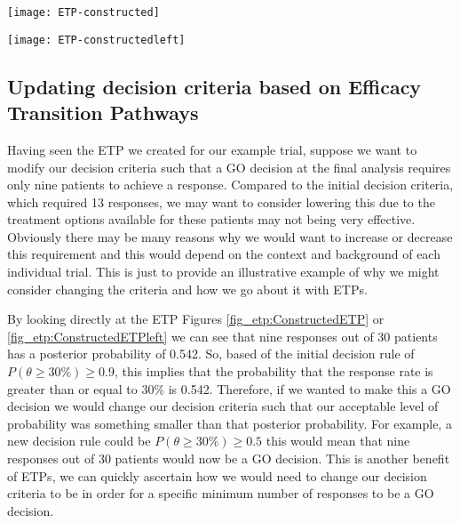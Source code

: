 \begin{sidewaysfigure}
	\centering
	\caption{Example of a constructed ETP.}
	\label{fig_etp:ConstructedETP}
	\texttt{[image: ETP-constructed]}
\end{sidewaysfigure}

\begin{sidewaysfigure}
	\centering
	\caption{A left aligned version of the constructed ETP.}
	\label{fig_etp:ConstructedETPleft}
	\texttt{[image: ETP-constructedleft]}
\end{sidewaysfigure}

\newpage

\subsection{Updating decision criteria based on Efficacy Transition Pathways} 
\label{etp:updatingETPs}

Having seen the ETP we created for our example trial, suppose we want to modify our decision criteria such that a GO decision at the final analysis requires only nine patients to achieve a response. Compared to the initial decision criteria, which required 13 responses, we may want to  consider lowering this due to the treatment options available for these patients may not being very effective. Obviously there may be many reasons why we would want to increase or decrease this requirement and this would depend on the context and background of each individual trial. This is just to provide an illustrative example of why we might consider changing the criteria and how we go about it with ETPs. 

By looking directly at the ETP Figures \ref{fig_etp:ConstructedETP} or \ref{fig_etp:ConstructedETPleft} we can see that nine responses out of 30 patients has a posterior probability of 0.542. So, based of the initial decision rule of $P(\theta  \geq 30\%) \geq 0.9$, this implies that the probability that the response rate is greater than or equal to 30\% is 0.542. Therefore, if we wanted to make this a GO decision we would change our decision criteria such that our acceptable level of probability was something smaller than that posterior probability. For example, a new decision rule could be $P(\theta  \geq 30\%) \geq 0.5$ this would mean that nine responses out of 30 patients would now be a GO decision. This is another benefit of ETPs, we can quickly ascertain how we would need to change our decision criteria to be in order for a specific minimum number of responses to be a GO decision. 

